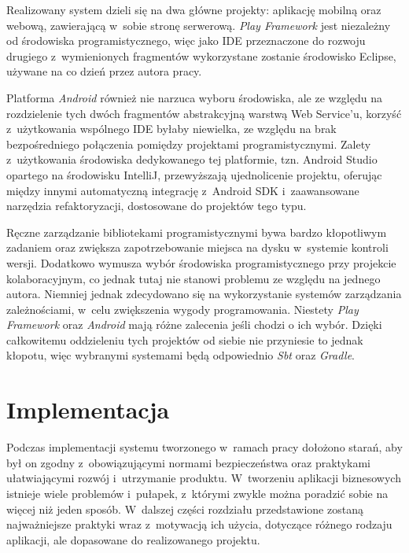 \documentclass[11pt]{aghdpl}
\begin{document}
Realizowany system dzieli się na dwa główne projekty: aplikację mobilną oraz webową, zawierającą w~sobie stronę serwerową. \emph{Play Framework} jest niezależny od środowiska programistycznego, więc jako IDE przeznaczone do rozwoju drugiego z~wymienionych fragmentów wykorzystane zostanie środowisko Eclipse, używane na co dzień przez autora pracy.

Platforma \emph{Android} również nie narzuca wyboru środowiska, ale ze względu na rozdzielenie tych dwóch fragmentów abstrakcyjną warstwą Web Service'u, korzyść z~użytkowania wspólnego IDE byłaby niewielka, ze względu na brak bezpośredniego połączenia pomiędzy projektami programistycznymi. Zalety z~użytkowania środowiska dedykowanego tej platformie, tzn. Android Studio opartego na środowisku IntelliJ, przewyższają ujednolicenie projektu, oferując między innymi automatyczną integrację z~Android SDK i~zaawansowane narzędzia refaktoryzacji, dostosowane do projektów tego typu.

Ręczne zarządzanie bibliotekami programistycznymi bywa bardzo kłopotliwym zadaniem oraz zwiększa zapotrzebowanie miejsca na dysku w~systemie kontroli wersji. Dodatkowo wymusza wybór środowiska programistycznego przy projekcie kolaboracyjnym, co jednak tutaj nie stanowi problemu ze względu na jednego autora. Niemniej jednak zdecydowano się na wykorzystanie systemów zarządzania zależnościami, w~celu zwiększenia wygody programowania. Niestety \emph{Play Framework} oraz \emph{Android} mają różne zalecenia jeśli chodzi o ich wybór. Dzięki całkowitemu oddzieleniu tych projektów od siebie nie przyniesie to jednak kłopotu, więc wybranymi systemami będą odpowiednio \emph{Sbt} oraz \emph{Gradle}.


\chapter{Implementacja}
\label{cha:implementacja}

Podczas implementacji systemu tworzonego w~ramach pracy dołożono starań, aby był on zgodny z~obowiązującymi normami bezpieczeństwa oraz praktykami ułatwiającymi rozwój i~utrzymanie produktu. W~tworzeniu aplikacji biznesowych istnieje wiele problemów i~pułapek, z~którymi zwykle można poradzić sobie na więcej niż jeden sposób. W~dalszej części rozdziału przedstawione zostaną najważniejsze praktyki wraz z~motywacją ich użycia, dotyczące różnego rodzaju aplikacji, ale dopasowane do realizowanego projektu.
\end{document}
